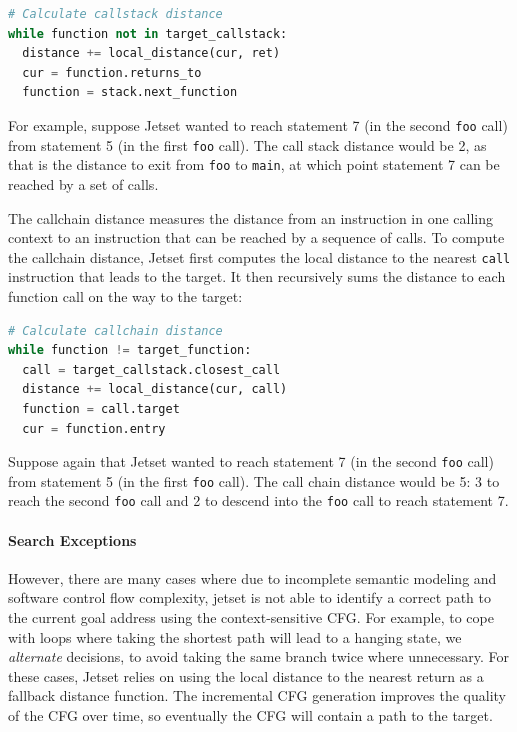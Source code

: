 \begin{lstlisting}[language=python]
# Calculate callstack distance
while function not in target_callstack:
  distance += local_distance(cur, ret)
  cur = function.returns_to
  function = stack.next_function  
\end{lstlisting}

For example, suppose Jetset wanted to reach statement 7 (in the second \texttt{foo} call) from statement 5 (in the first \texttt{foo} call).
The call stack distance would be 2, as that is the distance to exit from \texttt{foo} to \texttt{main}, at which point statement 7 can be reached by a set of calls.

The callchain distance measures the distance from an instruction in one calling context to an instruction that can be reached by a sequence of calls.
To compute the callchain distance, Jetset first computes the local distance to the nearest \texttt{call} instruction that leads to the target.
It then recursively sums the distance to each function call on the way to the target:

\newpage

\begin{lstlisting}[language=python]
# Calculate callchain distance
while function != target_function:
  call = target_callstack.closest_call
  distance += local_distance(cur, call)
  function = call.target
  cur = function.entry     
\end{lstlisting}

Suppose again  that Jetset wanted to reach statement 7 (in the second \texttt{foo} call) from statement 5 (in the first \texttt{foo} call).
The call chain distance would be 5: 3 to reach the second \texttt{foo} call and 2 to descend into the \texttt{foo} call to reach statement 7.

\paragraph{Search Exceptions}
However, there are many cases where due to incomplete semantic modeling and software control flow complexity, jetset is not able to identify a correct path to the current goal address using the context-sensitive CFG.
For example, to cope with loops where taking the shortest path will lead to a hanging state, we \emph{alternate} decisions, to avoid taking the same branch twice where unnecessary.
For these cases, Jetset relies on using the local distance to the nearest return as a fallback distance function.
The incremental CFG generation improves the quality of the CFG over time, so eventually the CFG will contain a path to the target.


